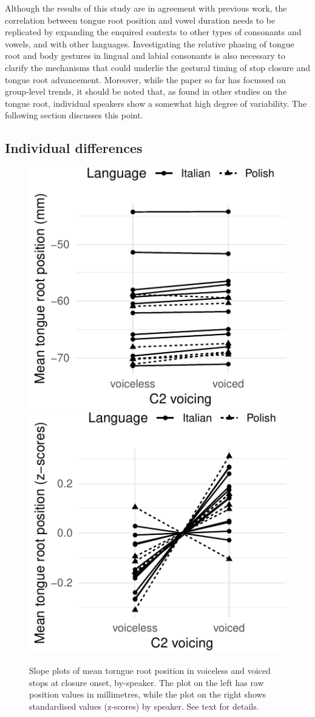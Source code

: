 \documentclass[12pt,]{article}
\begin{document}
Although the results of this study are in agreement with previous work,
the correlation between tongue root position and vowel duration needs to
be replicated by expanding the enquired contexts to other types of
consonants and vowels, and with other languages. Investigating the
relative phasing of tongue root and body gestures in lingual and labial
consonants is also necessary to clarify the mechanisms that could
underlie the gestural timing of stop closure and tongue root
advancement. Moreover, while the paper so far has focussed on
group-level trends, it should be noted that, as found in other studies
on the tongue root, individual speakers show a somewhat high degree of
variability. The following section discusses this point.

\hypertarget{individual-differences}{%
\subsection{Individual differences}\label{individual-differences}}

\label{s:idio}

\begin{figure}

{\centering \includegraphics[width=.49\linewidth]{2018-tra_files/figure-latex/trp-voicing-plot-1} \includegraphics[width=.49\linewidth]{2018-tra_files/figure-latex/trp-voicing-plot-2} 

}

\caption{Slope plots of mean torngue root position in voiceless and voiced stops at closure onset, by-speaker. The plot on the left has raw position values in millimetres, while the plot on the right shows standardised values (z-scores) by speaker. See text for details.}\label{f:trp-voicing-plot}
\end{figure}
\end{document}
